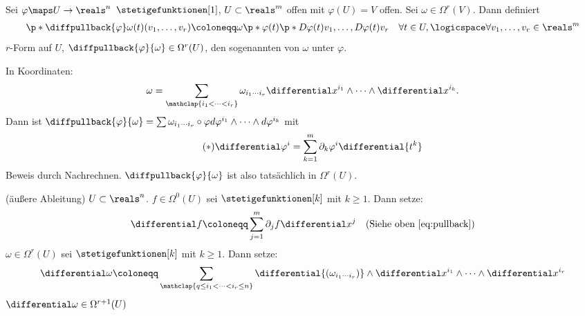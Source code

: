 \begin{definition} \label{pullback}
  Sei \( \varphi\maps U\to\reals^n\) \(\stetigefunktionen[1]\), \( U\subset\reals^m \) offen mit \( \varphi(U)=V \) offen.
  Sei \( \omega\in\Omega^r(V) \). Dann definiert 
  \begin{gather*}
      \p*{ \diffpullback{\varphi} \omega }(t)(v_1,\dotsc ,v_r)\coloneqq \omega\p*{ \varphi(t) }
      \p*{ D\varphi(t)v_1,\dotsc ,D\varphi(t)v_r }\quad  \forall t\in U,\logicspace  \forall v_1,\dotsc ,v_r\in\reals^m
  \end{gather*}
  \( r \)-Form auf \( U \), \( \diffpullback{\varphi}{\omega}\in\Omega^r(U) \), den sogenannten    von \( \omega \) unter \( \varphi \).

  In Koordinaten: 
  \begin{equation*}
      \omega=\sum_{\mathclap{i_1<\dotsb <i_r}} \omega_{i_1\cdots i_r}\differential x^{i_1}\wedge\dotsb \wedge \differential x^{i_k}.
  \end{equation*}
  Dann ist \( \diffpullback{\varphi}{\omega}=\sum \omega_{i_1\cdots i_r}\circ\varphi d\varphi^{i_1}\wedge\dotsb \wedge d\varphi^{i_k}  \) mit 
  \begin{equation}
      \tag{\( * \)} \label{eq:pullback}
      \differential\varphi^i=\sum_{k=1}^{m}\partial_k\varphi^i \differential{t^k}
  \end{equation}
  Beweis durch Nachrechnen. \( \diffpullback{\varphi}{\omega} \) ist also tatsächlich in \( \Omega^r(U) \).
\end{definition}

\begin{definition}
   (äußere Ableitung) \( U\subset\reals^n \).
  \( f\in\Omega^0(U) \) sei \( \stetigefunktionen[k] \) mit \( k\ge 1 \). Dann setze:
  \begin{equation*}
      \differential f \coloneqq \sum_{j=1}^{m}\partial_j f\differential x^j \quad (\text{Siehe oben \eqref{eq:pullback}})
  \end{equation*}
  \( \omega\in\Omega^r(U) \) sei \( \stetigefunktionen[k] \) mit \( k\ge 1 \). Dann setze:
  \begin{equation*}
      \differential \omega\coloneqq \sum_{\mathclap{q \leq i_1<\dotsb <i_r \leq n}} \differential{(\omega_{i_1\dotsm i_r})}\wedge \differential x^{i_1}\wedge\dotsb \wedge \differential x^{i_r}
  \end{equation*}
  \( \differential \omega\in\Omega^{r+1}(U) \)
\end{definition}

